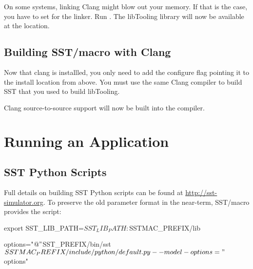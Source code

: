 
On some systems, linking Clang might blow out your memory. If that is the case, you have to set  for the linker.
Run . The libTooling library will now be available at the  location.

\subsection{Building SST/macro with Clang}
Now that clang is installled, you only need to add the configure flag  pointing it to the install location from above.
You must use the same Clang compiler to build SST that you used to build libTooling.


Clang source-to-source support will now be built into the  compiler.

\section{Running an Application}\label{sec:building:running}
\subsection{SST Python Scripts}
\label{subsec:SSTPythonScripts}

Full details on building SST Python scripts can be found at \url{http://sst-simulator.org}.  To preserve the old parameter format in the near-term, SST/macro provides the  script:

\begin{ViFile}
export SST_LIB_PATH=$SST_LIB_PATH:$SSTMAC_PREFIX/lib

options="$@"
$SST_PREFIX/bin/sst $SSTMAC_PREFIX/include/python/default.py --model-options="$options"
\end{ViFile}

